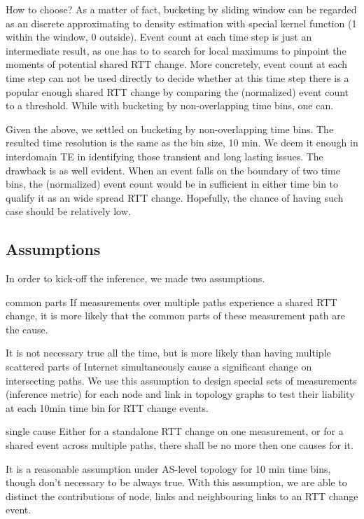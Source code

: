 How to choose? As a matter of fact, bucketing by sliding window can be regarded as an discrete approximating to density estimation with special kernel function (1 within the window, 0 outside). Event count at each time step is just an intermediate result, as one has to to search for local maximums to pinpoint the moments of potential shared RTT change.
More concretely, event count at each time step can not be used directly to decide whether at this time step there is a popular enough shared RTT change by comparing the (normalized) event count to a threshold. While with bucketing by non-overlapping time bins, one can.

Given the above, we settled on bucketing by non-overlapping time bins. The resulted time resolution is the same as the bin size, 10 min. We deem it enough in interdomain TE in identifying those transient and long lasting issues. The drawback is as well evident. When an event falls on the boundary of two time bins, the (normalized) event count would be in sufficient in either time bin to qualify it as an wide spread RTT change. Hopefully, the chance of having such case should be relatively low.

\subsection{Assumptions}
In order to kick-off the inference, we made two assumptions.

\begin{assumption}{1}{common parts}\label{as:1}
If measurements over multiple paths experience a shared RTT change, it is more likely that the common parts of these measurement path are the cause.
\end{assumption}
It is not necessary true all the time, but is more likely than having multiple scattered parts of Internet simultaneously cause a significant change on intersecting paths. We use this assumption to design special sets of measurements (inference metric) for each node and link in topology graphs to test their liability at each 10min time bin for RTT change events.

\begin{assumption}{2}{single cause}\label{as:2}
Either for a standalone RTT change on one measurement, or for a shared event across multiple paths, there shall be no more then one causes for it.
\end{assumption}
It is a reasonable assumption under AS-level topology for 10 min time bins, though don't necessary to be always true. With this assumption, we are able to distinct the contributions of node, links and neighbouring links to an RTT change event.


